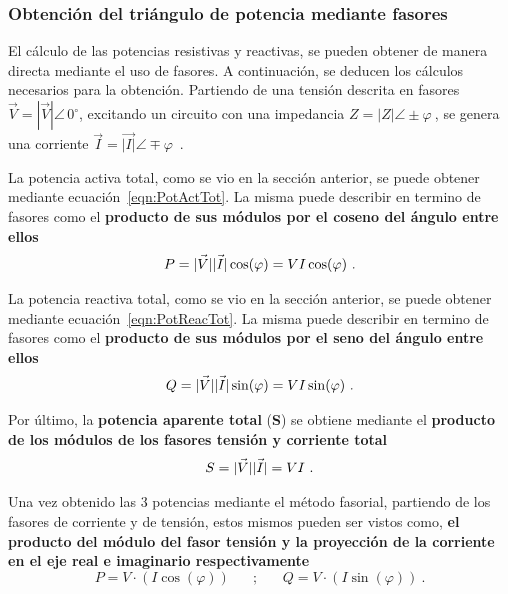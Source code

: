         \subsubsection{Obtención del triángulo de potencia mediante fasores}
            El cálculo de las potencias resistivas y reactivas, se pueden obtener de manera
            directa mediante el uso de fasores. A continuación, se deducen los cálculos
            necesarios para la obtención.
            Partiendo de una tensión descrita en fasores $\vec{V} = |\vec{V}| \angle \,  0^{\circ} $,
            excitando un circuito con una impedancia $ Z = |Z| \angle \pm \varphi \ $, se
            genera una corriente $\vec{I}  = \vec{|I|} \angle \mp   \varphi $~.

            La potencia activa total, como se vio en la sección anterior, se puede obtener 
            mediante ecuación~\ref{eqn:PotActTot}. La misma puede describir en termino de 
            fasores como el \textbf{producto de sus módulos por el coseno del ángulo entre ellos}
               \begin{align}
                  P = \vec{|V|} \vec{|I|} \cos(\varphi) = V I \cos(\varphi)~. \notag
               \end{align}   

            La potencia reactiva total, como se vio en la sección anterior, se puede obtener 
            mediante ecuación~\ref{eqn:PotReacTot}. La misma puede describir en termino de 
            fasores como el \textbf{producto de sus módulos por el seno del ángulo entre ellos}
               \begin{align}
                  Q = \vec{|V|} \vec{|I|} \sin(\varphi) = V I \sin(\varphi)~. \notag
               \end{align}               
            
               Por último, la \textbf{potencia aparente total} (\textbf{S}) se obtiene mediante el 
            \textbf{producto de los módulos de los fasores tensión y corriente total}  
               \begin{align}
                  S = \vec{|V|} \vec{|I|} = V I~. \notag
               \end{align}
            
               
            Una vez obtenido las 3 potencias mediante el método fasorial, partiendo de los 
            fasores de corriente y de tensión, estos mismos pueden ser vistos como, \textbf{
            el producto del módulo del fasor tensión y la proyección de la corriente en 
            el eje real e imaginario respectivamente}
               \begin{equation*}
                  P  = V \cdot(I \cos(\varphi)) \hspace{20pt} ;
                  \hspace{20pt} Q  = V \cdot(I \sin(\varphi))~.
               \end{equation*}   

